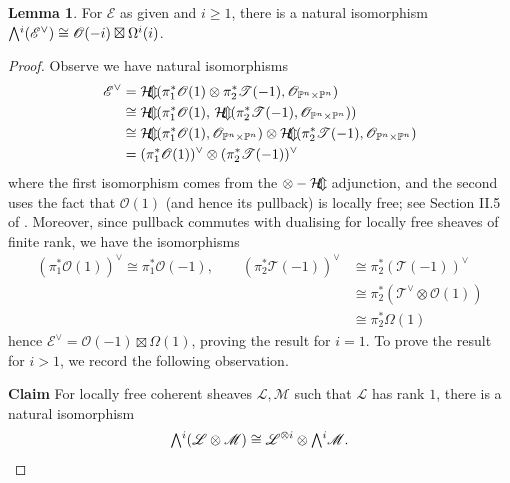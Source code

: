 \documentclass[a4paper]{article}
\theoremstyle{definition}
\newtheorem{lemma}[defn]{Lemma}
\theoremstyle{remark}
\newcommand{\Exter}{\mathchoice{{\textstyle\bigwedge}}%
    {{\bigwedge}}%
    {{\textstyle\wedge}}%
    {{\scriptstyle\wedge}}}
\DeclareMathOperator{\Homsh}{\mathcal{H\kern -3pt o\kern -2pt m\kern -1pt}}
\newcommand{\Pn}{\ensuremath{{\mathbb{P}^n}}}
\begin{document}
\begin{lemma}\label{Eexteriors}
    For \(\mathscr{E}\) as given and \(i\geq 1\), there is a natural isomorphism
    \(\Exter^i(\mathscr{E}^\vee)\cong \mathscr{O}(-i)\boxtimes \Omega^i(i)\).
    \begin{proof}
        Observe we have natural isomorphisms
        \begin{align*}
            \mathscr{E}^\vee 
            &= \Homsh(\pi_1^\ast\mathscr{O}(1)\otimes
            \pi_2^\ast\mathscr{T}(-1), \mathscr{O}_{\Pn\times \Pn}) \\ 
            &\cong  \Homsh(\pi_1^\ast\mathscr{O}(1),
            \, \Homsh(\pi_2^\ast \mathscr{T}(-1),
            \mathscr{O}_{\Pn\times\Pn}))  \\ 
            &\cong  \Homsh(\pi_1^\ast\mathscr{O}(1), \mathscr{O}_{\Pn\times
            \Pn}) \otimes  \Homsh(\pi_2^\ast\mathscr{T}(-1),
            \mathscr{O}_{\Pn\times\Pn}) \\ 
            &= (\pi_1^\ast \mathscr{O}(1))^\vee \otimes (\pi_2^\ast
            \mathscr{T}(-1))^\vee
        \end{align*}
        where the first isomorphism comes from the \(\otimes-\Homsh\)
        adjunction, and the second uses the fact that \(\mathscr{O}(1)\) (and
        hence its pullback) is locally free; see Section II.5 of
        . Moreover, since pullback
        commutes with dualising for locally free sheaves of finite rank, we have
        the isomorphisms
        \begin{align*}
        (\pi_1^\ast\mathscr{O}(1))^\vee \cong \pi_1^\ast \mathscr{O}(-1), \qquad  
        (\pi_2^\ast \mathscr{T}(-1))^\vee &\cong \pi_2^\ast
        (\mathscr{T}(-1))^\vee \\ 
                                          &\cong \pi_2^\ast (\mathscr{T}^\vee\otimes
                                          \mathscr{O}(1)) \\
                                          &\cong \pi_2^\ast \Omega(1)
        \end{align*}
        hence \(\mathscr{E}^\vee = \mathscr{O}(-1)\boxtimes \Omega(1)\), proving
        the result for \(i=1\). To prove the result for \(i>1\), we record the
        following observation.  

        \textbf{Claim} For locally free coherent sheaves
        \(\mathscr{L},\mathscr{M}\) such that \(\mathscr{L}\) has rank \(1\),
        there is a natural isomorphism
        \[\Exter^i(\mathscr{L}\otimes \mathscr{M})\cong \mathscr{L}^{\otimes
            i} \otimes \Exter^i \mathscr{M} .\] 


\end{proof}
\end{lemma}
\end{document}
